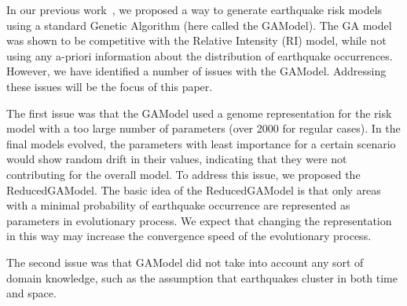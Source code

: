In our previous work~\cite{ecta14}, we proposed a way to generate
earthquake risk models using a standard Genetic Algorithm (here called
the GAModel). The GA model was shown to be competitive with the
Relative Intensity (RI) model, while not using any a-priori
information about the distribution of earthquake occurrences. However,
we have identified a number of issues with the GAModel. Addressing
these issues will be the focus of this paper.

The first issue was that the GAModel used a genome representation for
the risk model with a too large number of parameters (over 2000 for
regular cases). In the final models evolved, the parameters with least
importance for a certain scenario would show random drift in their
values, indicating that they were not contributing for the overall
model.  To address this issue, we proposed the ReducedGAModel. The
basic idea of the ReducedGAModel is that only areas with a minimal
probability of earthquake occurrence are represented as parameters in
evolutionary process. We expect that changing the representation in
this way may increase the convergence speed of the evolutionary
process.

The second issue was that GAModel did not take into account any 
sort of domain knowledge, such as the assumption that earthquakes
cluster in both time and space.







